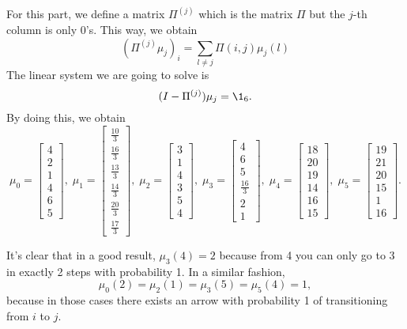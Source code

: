 For this part, we define a matrix $\Pi^{(j)}$ which is the matrix $\Pi$ but the $j$-th column is only 0's. This way, we obtain
\[ {(\Pi^{(j)} \mu_j )}_i = \sum_{l \neq j} \Pi(i,j) \mu_j(l) \]
The linear system we are going to solve is 
\[ (I-\Pi^{(j)})\mu_j = \1_{6}. \]
By doing this, we obtain
\[ 
\mu_0 = \left[\begin{matrix}4\\2\\1\\4\\6\\5\end{matrix}\right],\;
\mu_1 = \left[\begin{matrix}\frac{10}{3}\\\frac{16}{3}\\\frac{13}{3}\\\frac{14}{3}\\\frac{20}{3}\\\frac{17}{3}\end{matrix}\right],\;
\mu_2 = \left[\begin{matrix}3\\1\\4\\3\\5\\4\end{matrix}\right],\;
\mu_3 = \left[\begin{matrix}4\\6\\5\\\frac{16}{3}\\2\\1\end{matrix}\right],\;
\mu_4 = \left[\begin{matrix}18\\20\\19\\14\\16\\15\end{matrix}\right],\;
\mu_5 = \left[\begin{matrix}19\\21\\20\\15\\1\\16\end{matrix}\right]. \]

It's clear that in a good result, $\mu_3(4) = 2$ because from 4 you can only go to 3 in exactly 2 steps with probability 1. In a similar fashion,
\[ \mu_0(2) = \mu_2(1) = \mu_3(5) =\mu_5(4) = 1, \]
because in those cases there exists an arrow with probability 1 of transitioning from $i$ to $j$.

